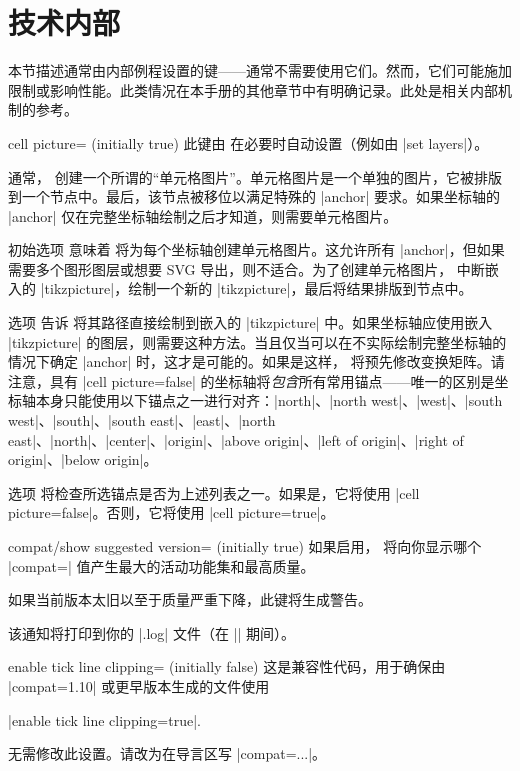 
\section{技术内部}

{

本节描述通常由内部例程设置的键——通常不需要使用它们。然而，它们可能施加限制或影响性能。此类情况在本手册的其他章节中有明确记录。此处是相关内部机制的参考。

\begin{pgfplotskey}{cell picture= (initially true)}
    此键由 \PGFPlots{} 在必要时自动设置（例如由 |set layers|）。

    通常，\PGFPlots{} 创建一个所谓的“单元格图片”。单元格图片是一个单独的图片，它被排版到一个节点中。最后，该节点被移位以满足特殊的 |anchor| 要求。如果坐标轴的 |anchor| 仅在完整坐标轴绘制之后才知道，则需要单元格图片。

    初始选项  意味着 \PGFPlots{} 将为每个坐标轴创建单元格图片。这允许所有 |anchor|，但如果需要多个图形图层或想要 SVG 导出，则不适合。为了创建单元格图片，\PGFPlots{} 中断嵌入的 |tikzpicture|，绘制一个新的 |tikzpicture|，最后将结果排版到节点中。

    选项  告诉 \PGFPlots{} 将其路径直接绘制到嵌入的 |tikzpicture| 中。如果坐标轴应使用嵌入 |tikzpicture| 的图层，则需要这种方法。当且仅当可以在不实际绘制完整坐标轴的情况下确定 |anchor| 时，这才是可能的。如果是这样，\PGFPlots{} 将预先修改变换矩阵。请注意，具有 |cell picture=false| 的坐标轴将\emph{包含}所有常用锚点——唯一的区别是坐标轴本身只能使用以下锚点之一进行对齐：|north|、|north west|、|west|、|south west|、|south|、|south east|、|east|、|north east|、|north|、|center|、|origin|、|above origin|、|left of origin|、|right of origin|、|below origin|。

    选项  将检查所选锚点是否为上述列表之一。如果是，它将使用 |cell picture=false|。否则，它将使用 |cell picture=true|。
\end{pgfplotskey}

\begin{pgfplotskey}{compat/show suggested version= (initially true)}
    如果启用，\PGFPlots{} 将向你显示哪个 |compat=| 值产生最大的活动功能集和最高质量。

    如果当前版本太旧以至于质量严重下降，此键将生成警告。

    该通知将打印到你的 |.log| 文件（在 || 期间）。
\end{pgfplotskey}

\begin{pgfplotskey}{enable tick line clipping= (initially false)}
    这是兼容性代码，用于确保由 |compat=1.10| 或更早版本生成的文件使用

    |enable tick line clipping=true|.

    无需修改此设置。请改为在导言区写 |compat=...|。
\end{pgfplotskey}
}
